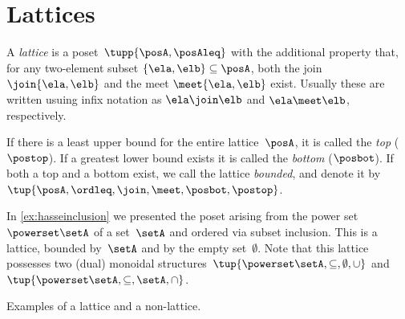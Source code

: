 

\section{Lattices}



\begin{definition}[Lattice]
  \label{def:lattice}
  A \emph{lattice} is a poset~$\tupp{\posA,\posAleq}$ with the additional property that, for any two-element subset $\{\ela, \elb \} \subseteq \posA$, both the join $\join \{\ela, \elb \}$ and the meet $\meet \{\ela, \elb \}$ exist. Usually these are written usuing infix notation as $\ela \join \elb$ and $\ela \meet \elb$, respectively. 
\end{definition}
 

\begin{remark}\label{rem:bounded-lattices}
  \label{def:top}
  \label{def:bot}
  If there is a least upper bound for the entire lattice~$\posA$, it is called
  the \emph{top} ($\postop$). If a greatest lower bound exists it is called the \emph{bottom} ($\posbot$). If both a top and a bottom exist, we call the lattice \emph{bounded}, and denote it by~$\tup{\posA,\ordleq,\join,\meet,\posbot,\postop}$.
\end{remark}

\begin{example}
  In \cref{ex:hasseinclusion} we presented the poset arising from the power set~$\powerset \setA$ of a set~$\setA$ and ordered via subset inclusion. This is a lattice, bounded by~$\setA$ and by the empty set~$\emptyset$. Note that this lattice possesses two (dual) monoidal structures~$\tup{\powerset \setA,\subseteq,\emptyset,\cup}$ and~$\tup{\powerset \setA,\subseteq,\setA,\cap}$.
\end{example}
\begin{marginfigure}


\caption{Examples of a lattice and a non-lattice. }
\label{fig:exlattice}
\end{marginfigure}

